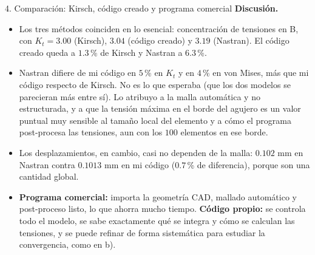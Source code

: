 \begin{desarrollo}{4. Comparaci\'on: Kirsch, c\'odigo creado y programa comercial}
\textbf{Discusi\'on.}
\begin{itemize}[itemsep=3pt]
  \item Los tres m\'etodos coinciden en lo esencial: concentraci\'on de
  tensiones en B, con $K_t=3.00$ (Kirsch), $3.04$ (c\'odigo creado) y $3.19$
  (Nastran). El c\'odigo creado queda a $1.3$\,\% de Kirsch y Nastran a $6.3$\,\%.
  \item Nastran difiere de mi c\'odigo en $5$\,\% en $K_t$ y en $4$\,\% en
  von Mises, m\'as que mi c\'odigo respecto de Kirsch. No es lo que esperaba
  (que los dos modelos se parecieran m\'as entre s\'i). Lo atribuyo a la malla
  autom\'atica y no estructurada, y a que la tensi\'on m\'axima en el borde del
  agujero es un valor puntual muy sensible al tama\~no local del elemento y a
  c\'omo el programa post-procesa las tensiones, aun con los $100$ elementos en
  ese borde.
  \item Los desplazamientos, en cambio, casi no dependen de la malla:
  $0.102$ mm en Nastran contra $0.1013$ mm en mi c\'odigo ($0.7$\,\% de
  diferencia), porque son una cantidad global.
  \item \textbf{Programa comercial:} importa la geometr\'ia CAD, mallado
  autom\'atico y post-proceso listo, lo que ahorra mucho tiempo. \textbf{C\'odigo
  propio:} se controla todo el modelo, se sabe exactamente qu\'e se integra y
  c\'omo se calculan las tensiones, y se puede refinar de forma sistem\'atica
  para estudiar la convergencia, como en b).
\end{itemize}
\end{desarrollo}
